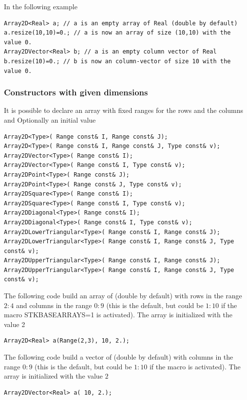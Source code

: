 \documentclass[a4paper,10pt]{article}
\begin{document}
In the following example
\begin{lstlisting}[style=customcpp]
Array2D<Real> a; // a is an empty array of Real (double by default)
a.resize(10,10)=0.; // a is now an array of size (10,10) with the value 0.
Array2DVector<Real> b; // a is an empty column vector of Real
b.resize(10)=0.; // b is now an column-vector of size 10 with the value 0.
\end{lstlisting}

\subsubsection{Constructors with given dimensions}
It is possible to declare an array with fixed ranges for the rows and the columns and
Optionally an initial value
\begin{lstlisting}[style=customcpp]
Array2D<Type>( Range const& I, Range const& J);
Array2D<Type>( Range const& I, Range const& J, Type const& v);
Array2DVector<Type>( Range const& I);
Array2DVector<Type>( Range const& I, Type const& v);
Array2DPoint<Type>( Range const& J);
Array2DPoint<Type>( Range const& J, Type const& v);
Array2DSquare<Type>( Range const& I);
Array2DSquare<Type>( Range const& I, Type const& v);
Array2DDiagonal<Type>( Range const& I);
Array2DDiagonal<Type>( Range const& I, Type const& v);
Array2DLowerTriangular<Type>( Range const& I, Range const& J);
Array2DLowerTriangular<Type>( Range const& I, Range const& J, Type const& v);
Array2DUpperTriangular<Type>( Range const& I, Range const& J);
Array2DUpperTriangular<Type>( Range const& I, Range const& J, Type const& v);
\end{lstlisting}

The following code build an array of  (double by default) with rows in
the range $2:4$ and columns in the range $0:9$ (this is the default, but could be
$1:10$ if the macro STKBASEARRAYS=1 is activated). The array is initialized with
the value 2
\begin{lstlisting}[style=customcpp]
Array2D<Real> a(Range(2,3), 10, 2.);
\end{lstlisting}

The following code build a vector of  (double by default) with columns
in the range $0:9$ (this is the default, but could be $1:10$ if the macro 
is activated). The array is initialized with the value $2$
\begin{lstlisting}[style=customcpp]
Array2DVector<Real> a( 10, 2.);
\end{lstlisting}
\end{document}
